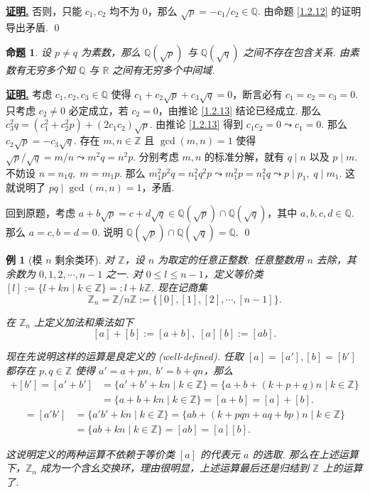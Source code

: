 \documentclass[10pt,openany]{article}
\theoremstyle{thmstyle} %
\theoremstyle{defstyle} %
\theoremstyle{prostyle} %
\newtheorem{proposition}[theorem]{命题}
\theoremstyle{exastyle}
\newtheorem{example}[theorem]{例}
\theoremstyle{remstyle}
\renewenvironment{proof}[1][证明]{\par\underline{\textbf{#1.}} \;\fangsong}{\qed\par}
\begin{document}
\begin{proof}
	否则，只能 \( c_1,c_2 \) 均不为 0，那么 \( \sqrt{p}=-c_1/c_2 \in \mathbb{Q} \). 由命题 \ref{1.2.12} 的证明导出矛盾.
\end{proof}

\begin{proposition}
	设 \( p \neq q \) 为素数，那么 \( \mathbb{Q}(\sqrt{p}) \) 与 \( \mathbb{Q}(\sqrt{q}) \) 之间不存在包含关系. 由素数有无穷多个知 \( \mathbb{Q} \) 与 \( \mathbb{R} \) 之间有无穷多个中间域.
\end{proposition}

\begin{proof}
	考虑 \( c_1,c_2,c_3 \in \mathbb{Q} \) 使得 \( c_1+c_2\sqrt{p}+c_3\sqrt{q}=0 \)，断言必有 \( c_1=c_2=c_3=0 \). 只考虑 \( c_2 \neq 0 \) 必定成立，若 \( c_2=0 \)，由推论 \ref{1.2.13} 结论已经成立. 那么 \( c_3^2q=(c_1^2+c_2^2p)+(2c_1c_2)\sqrt{p} \). 由推论 \ref{1.2.13} 得到 \( c_1c_2=0 \leadsto c_1=0 \). 那么 \( c_2\sqrt{p}=-c_3\sqrt{q} \). 存在 \( m,n \in \mathbb{Z} \) 且 \( \gcd(m,n)=1 \) 使得 \( \sqrt{p}/\sqrt{q}=m/n \leadsto m^2q=n^2p \). 分别考虑 \( m,n \) 的标准分解，就有 \( q \mid n \) 以及 \( p \mid m \). 不妨设 \( n=n_1q, \; m=m_1p \). 那么 \( m_1^2p^2q=n_1^2q^2p \leadsto m_1^2p=n_1^2q \leadsto p \mid p_1, \; q \mid m_1 \). 这就说明了 \( pq \mid \gcd(m,n)=1 \)，矛盾. 
	
	回到原题，考虑 \( a+b\sqrt{p}=c+d\sqrt{q} \in \mathbb{Q}(\sqrt{p}) \cap \mathbb{Q}(\sqrt{q}) \)，其中 \( a,b,c,d \in \mathbb{Q} \). 那么 \( a=c, b=d=0 \). 说明 \( \mathbb{Q}(\sqrt{p}) \cap \mathbb{Q}(\sqrt{q})=\mathbb{Q} \). 
\end{proof}

\begin{example}[模 \( n \) 剩余类环]
	对 \( \mathbb{Z} \)，设 \( n \) 为取定的任意正整数. 任意整数用 \( n \) 去除，其余数为 \( 0,1,2,\cdots,n-1 \) 之一. 对 \( 0 \leq l \leq n-1 \)，定义等价类 \( [l]:=\{l+kn\mid k \in \mathbb{Z}\}=:l+k\mathbb{Z} \). 现在记商集
	\[ \mathbb{Z}_n=\mathbb{Z}/n\mathbb{Z}:=\{ [0],[1],[2],\cdots,[n-1]\}. \]
	
	在 \( \mathbb{Z}_n \) 上定义加法和乘法如下
	\[ [a]+[b]:=[a+b], \; [a][b]:=[ab]. \]
	
	现在先说明这样的运算是良定义的 (well-defined). 任取 \( [a]=[a'], [b]=[b']  \) 都存在 \( p,q \in \mathbb{Z} \) 使得 \( a'=a+pn, \; b'=b+qn \)，那么
	\begin{align*}
	[a']+[b']=[a'+b'] &=\{a'+b'+kn \mid k \in \mathbb{Z} \}=\{a+b+(k+p+q)n \mid k \in \mathbb{Z} \} \\
	&=\{a+b+kn \mid k \in \mathbb{Z} \}=[a+b]=[a]+[b].
	\end{align*}
	\begin{align*}
		[a'][b']=[a'b'] &=\{a'b'+kn \mid k \in \mathbb{Z} \}=\{ab+(k+pqn+aq+bp)n \mid k \in \mathbb{Z} \} \\
		&=\{ab+kn \mid k \in \mathbb{Z} \}=[ab]=[a][b].
	\end{align*}

	
	这说明定义的两种运算不依赖于等价类 \( [a] \) 的代表元 \( a \) 的选取. 那么在上述运算下，\( \mathbb{Z}_n \) 成为一个含幺交换环，理由很明显，上述运算最后还是归结到 \( \mathbb{Z} \) 上的运算了.
\end{example}
\end{document}
